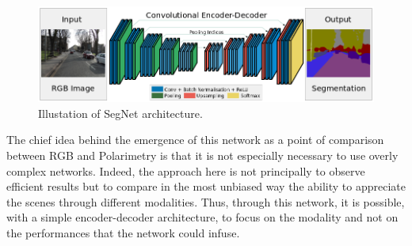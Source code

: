 \begin{figure}[h]
	\centering
	\includegraphics[width=\linewidth]{Figures/master-thesis/segnet.png}
	\caption{Illustation of SegNet architecture.}\label{seg-arch}
\end{figure}

The chief idea behind the emergence of this network as a point of comparison between RGB and Polarimetry is that it is not especially necessary to use overly complex networks. Indeed, the approach here is not principally to observe efficient results but to compare in the most unbiased way the ability to appreciate the scenes through different modalities. 
Thus, through this network, it is possible, with a simple encoder-decoder architecture, to focus on the modality and not on the performances that the network could infuse.


